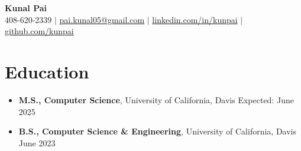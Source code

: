 \documentclass[letterpaper,10pt]{article}
\makeatletter
\newcommand{\resumeSubheading}[4]{
\vspace{-1pt}\item
  \begin{tabular*}{0.97\textwidth}[t]{l@{\extracolsep{\fill}}r}
    \textbf{#1} & #2 \\
    \textit{#3} & \textit{#4} \\
  \end{tabular*}\vspace{-7pt}
}
\newcommand{\resumeSubHeadingList}{\begin{itemize}[leftmargin=0.15in, label={}]}
\newcommand{\resumeSubHeadingListEnd}{\end{itemize}}
\makeatother
\begin{document}
\begin{center}
  \textbf{\Huge Kunal Pai} \\
  \small 408-620-2339 $|$ \href{mailto:pai.kunal05@gmail.com}{pai.kunal05@gmail.com} $|$ 
  \href{https://linkedin.com/in/kunpai}{linkedin.com/in/kunpai} $|$
  \href{https://github.com/kunpai}{github.com/kunpai}
\end{center}

\section{Education}
\begin{itemize}[leftmargin=0.15in, label={}]
    \item \textbf{M.S., Computer Science}, University of California, Davis \hfill Expected: June 2025
    \item \textbf{B.S., Computer Science \& Engineering}, University of California, Davis \hfill June 2023
  \end{itemize} %

\end{document}
